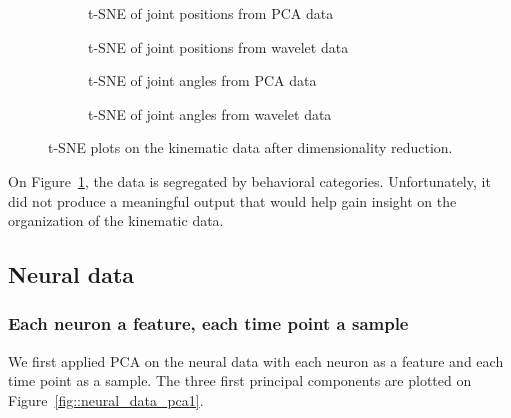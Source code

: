 \begin{figure}[htbp]
	\begin{subfigure}{.49\textwidth}
		\begin{center}
			
			\caption{t-SNE of joint positions from PCA data}
		\end{center}
	\end{subfigure}
	\begin{subfigure}{.49\textwidth}
		\begin{center}
			
			\caption{t-SNE of joint positions from wavelet data}
		\end{center}
	\end{subfigure}
	\begin{subfigure}{.49\textwidth}
		\begin{center}
			
			\caption{t-SNE of joint angles from PCA data}
		\end{center}
	\end{subfigure}
	\begin{subfigure}{.49\textwidth}
		\begin{center}
			
			\caption{t-SNE of joint angles from wavelet data}
		\end{center}
	\end{subfigure}
	\caption{t-SNE plots on the kinematic data after dimensionality reduction.}
	\label{fig::kinematic_data_tsne}
\end{figure}

On Figure~\ref{fig::kinematic_data_tsne}, the data is segregated by behavioral categories.
Unfortunately, it did not produce a meaningful output that would help gain insight on the organization of the kinematic data.

\subsection{Neural data}

\subsubsection{Each neuron a feature, each time point a sample}

We first applied PCA on the neural data with each neuron as a feature and each time point as a sample.
The three first principal components are plotted on Figure~\ref{fig::neural_data_pca1}.

